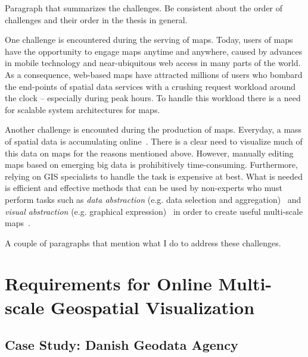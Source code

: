 Paragraph that summarizes the challenges. Be consistent about the order of challenges and their order in the thesis in general.

One challenge is encountered during the serving of maps. Today, users of maps have the opportunity to engage maps anytime and anywhere, caused by advances in mobile technology and near-ubiquitous web access in many parts of the world. As a consequence, web-based maps have attracted millions of users who bombard the end-points of spatial data services with a crushing request workload around the clock -- especially during peak hours. To handle this workload there is a need for scalable system architectures for maps. %

Another challenge is encounted during the production of maps. Everyday, a mass of spatial data is accumulating online~\cite{agrawal2012bigdata}. There is a clear need to visualize much of this data on maps for the reasons mentioned above. However, manually editing maps based on emerging big data is prohibitively time-consuming. Furthermore, relying on GIS specialists to handle the task is expensive at best. What is needed is efficient and effective methods that can be used by non-experts who must perform tasks such as \emph{data abstraction} (e.g. data selection and aggregation)~\cite{haunert2006landcover,schmid2013opensciencemap} and \emph{visual abstraction} (e.g. graphical expression)~\cite{jacques1967semiologie} in order to create useful multi-scale maps~\cite{stolte2003multiscale,weibel1999generalising}. 

A couple of paragraphs that mention what I do to address these challenges. 


\section{Requirements for Online Multi-scale Geospatial Visualization}
\subsection{Case Study: Danish Geodata Agency}

